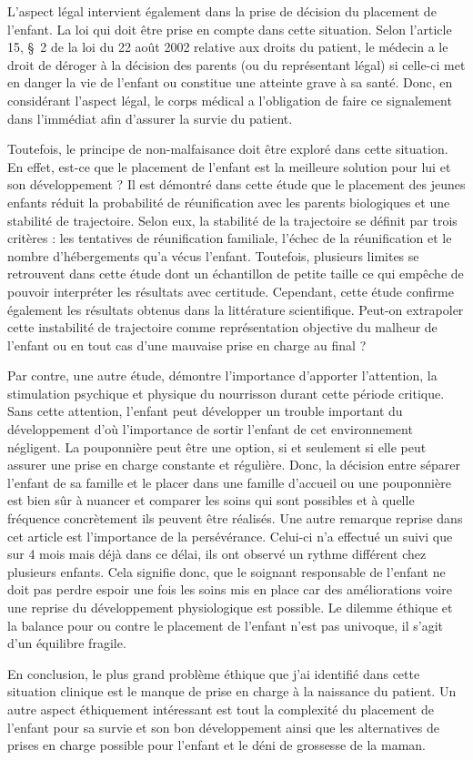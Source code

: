 L’aspect légal intervient également dans la prise de décision du placement de l’enfant. La loi qui doit être prise en compte dans cette situation. Selon l'article 15, §~2 de la loi du 22 août 2002 relative aux droits du patient, le médecin a le droit de déroger à la décision des parents (ou du représentant légal) si celle-ci met en danger la vie de l'enfant ou constitue une atteinte grave à sa santé. Donc, en considérant l’aspect légal, le corps médical a l’obligation de faire ce signalement dans l’immédiat afin d’assurer la survie du patient.

Toutefois, le principe de non-malfaisance doit être exploré dans cette situation. En effet, est-ce que le placement de l’enfant est la meilleure solution pour lui et son développement ? Il est démontré dans cette étude \textcite{poitras2017contacts} que le placement des jeunes enfants réduit la probabilité de réunification avec les parents biologiques et une stabilité de trajectoire. Selon eux, la stabilité de la trajectoire se définit par trois critères : les tentatives de réunification familiale, l’échec de la réunification et le nombre d’hébergements qu’a vécus l’enfant. Toutefois, plusieurs limites se retrouvent dans cette étude dont un échantillon de petite taille ce qui empêche de pouvoir interpréter les résultats avec certitude. Cependant, cette étude confirme également les résultats obtenus dans la littérature scientifique. Peut-on extrapoler cette instabilité de trajectoire comme représentation objective du malheur de l’enfant ou en tout cas d’une mauvaise prise en charge au final ?

Par contre, une autre étude, \textcite{mascaro2012evaluation} démontre l’importance d’apporter l’attention, la stimulation psychique et physique du nourrisson durant cette période critique. Sans cette attention, l’enfant peut développer un trouble important du développement d’où l’importance de sortir l’enfant de cet environnement négligent. La pouponnière peut être une option, si et seulement si elle peut assurer une prise en charge constante et régulière. Donc, la décision entre séparer l’enfant de sa famille et le placer dans une famille d’accueil ou une pouponnière est bien sûr à nuancer et comparer les soins qui sont possibles et à quelle fréquence concrètement ils peuvent être réalisés. Une autre remarque reprise dans cet article est l’importance de la persévérance. Celui-ci n’a effectué un suivi que sur 4 mois mais déjà dans ce délai, ils ont observé un rythme différent chez plusieurs enfants. Cela signifie donc, que le soignant responsable de l’enfant ne doit pas perdre espoir une fois les soins mis en place car des améliorations voire une reprise du développement physiologique est possible. Le dilemme éthique et la balance pour ou contre le placement de l’enfant n’est pas univoque, il s’agit d’un équilibre fragile.

En conclusion, le plus grand problème éthique que j’ai identifié dans cette situation clinique est le manque de prise en charge à la naissance du patient. Un autre aspect éthiquement intéressant est tout la complexité du placement de l’enfant pour sa survie et son bon développement ainsi que les alternatives de prises en charge possible pour l’enfant et le déni de grossesse de la maman.
